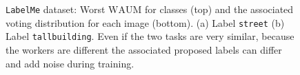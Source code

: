 \begin{figure}[htb]
    \label{fig:labelme_worstWAUM}%
    \centering
    \hfill
    \hfill
    \caption{\texttt{LabelMe} dataset: Worst $\mathrm{WAUM}$ for classes (top) and the associated voting distribution for each image (bottom). (a) Label \texttt{street} (b)  Label \texttt{tallbuilding}.
        Even if the two tasks are very similar, because the workers are different the associated proposed labels can differ and add noise during training.}
\end{figure}

